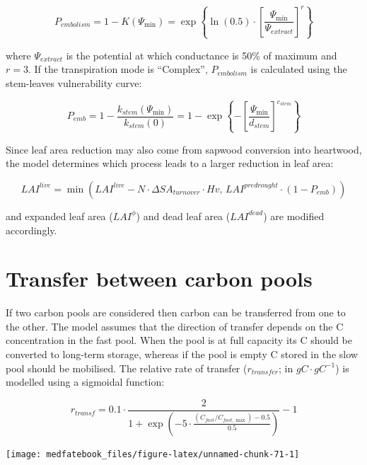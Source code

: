 \documentclass[]{book}
\begin{document}
\begin{equation}
P_{embolism}=1- K(\Psi_{\min}) = \exp \left \{\ln{(0.5)}\cdot \left[ \frac{\Psi_{\min}}{\Psi_{extract}} \right] ^r \right \} 
\end{equation}

where \(\Psi_{extract}\) is the potential at which conductance is 50\%
of maximum and \(r=3\). If the transpiration mode is ``Complex'',
\(P_{embolism}\) is calculated using the stem-leaves vulnerability
curve:

\begin{equation}
P_{emb}= 1- \frac{k_{stem}(\Psi_{\min})}{k_{stem}(0)} = 1 - \exp \left \{-\left[ \frac{\Psi_{\min}}{d_{stem}} \right] ^{c_{stem}} \right \} 
\end{equation}

Since leaf area reduction may also come from sapwood conversion into
heartwood, the model determines which process leads to a larger
reduction in leaf area:

\begin{equation}
LAI^{live} = \min(LAI^{live} - N \cdot \Delta SA_{turnover} \cdot Hv , \, LAI^{predrought} \cdot (1 - P_{emb}))
\end{equation}

and expanded leaf area (\(LAI^{\phi}\)) and dead leaf area
(\(LAI^{dead}\)) are modified accordingly.

\section{Transfer between carbon
pools}\label{transfer-between-carbon-pools}

If two carbon pools are considered then carbon can be transferred from
one to the other. The model assumes that the direction of transfer
depends on the C concentration in the fast pool. When the pool is at
full capacity its C should be converted to long-term storage, whereas if
the pool is empty C stored in the slow pool should be mobilised. The
relative rate of transfer (\(r_{transfer}\); in \(g C·g C^{-1}\)) is
modelled using a sigmoidal function:

\begin{equation}
r_{transf} = 0.1 \cdot \frac{2}{1+\exp \left(-5 \cdot \frac{(C_{fast}/C_{fast, \max})-0.5}{0.5}\right)}-1
\end{equation}

\begin{center}\texttt{[image: medfatebook\_files/figure-latex/unnamed-chunk-71-1]} \end{center}
\end{document}
